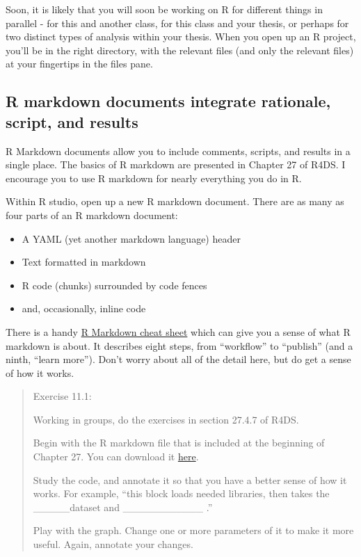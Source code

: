 \documentclass[
]{article}
\providecommand{\tightlist}{%
  \setlength{\itemsep}{0pt}\setlength{\parskip}{0pt}}
\begin{document}
Soon, it is likely that you will soon be working on R for different
things in parallel - for this and another class, for this class and your
thesis, or perhaps for two distinct types of analysis within your
thesis. When you open up an R project, you'll be in the right directory,
with the relevant files (and only the relevant files) at your fingertips
in the files pane.

\hypertarget{r-markdown-documents-integrate-rationale-script-and-results}{%
\subsection{R markdown documents integrate rationale, script, and
results}\label{r-markdown-documents-integrate-rationale-script-and-results}}

R Markdown documents allow you to include comments, scripts, and results
in a single place. The basics of R markdown are presented in Chapter 27
of R4DS. I encourage you to use R markdown for nearly everything you do
in R.

Within R studio, open up a new R markdown document. There are as many as
four parts of an R markdown document:

\begin{itemize}
\tightlist
\item
  A YAML (yet another markdown language) header
\item
  Text formatted in markdown
\item
  R code (chunks) surrounded by code fences
\item
  and, occasionally, inline code
\end{itemize}

There is a handy
\href{https://www.rstudio.com/wp-content/uploads/2015/02/rmarkdown-cheatsheet.pdf}{R
Markdown cheat sheet} which can give you a sense of what R markdown is
about. It describes eight steps, from ``workflow'' to ``publish'' (and a
ninth, ``learn more''). Don't worry about all of the detail here, but do
get a sense of how it works.

\begin{quote}
Exercise 11.1:

Working in groups, do the exercises in section 27.4.7 of R4DS.

Begin with the R markdown file that is included at the beginning of
Chapter 27. You can download it
\href{https://raw.githubusercontent.com/hadley/r4ds/master/rmarkdown/diamond-sizes.Rmd}{here}.

Study the code, and annotate it so that you have a better sense of how
it works. For example, ``this block loads needed libraries, then takes
the \_\_\_\_\_dataset and \_\_\_\_\_\_\_\_\_\_\_ .''

Play with the graph. Change one or more parameters of it to make it more
useful. Again, annotate your changes.
\end{quote}
\end{document}

